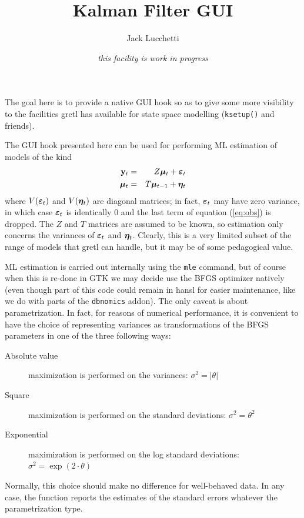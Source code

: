 \documentclass[a4paper]{article}
\title{Kalman Filter GUI}
\author{Jack Lucchetti}
\date{\it this facility is work in progress}
\newcommand{\obs}{\ensuremath\mathbf{y}_t}
\newcommand{\obsdist}{\ensuremath\boldsymbol{\varepsilon}_t}
\newcommand{\state}[1]{\ensuremath\boldsymbol{\mu}_{#1}}
\newcommand{\stdist}{\ensuremath\boldsymbol{\eta}_t}
\begin{document}
\maketitle

The goal here is to provide a native GUI hook so as to give some more
visibility to the facilities gretl has available for state space
modelling (\texttt{ksetup()} and friends).

The GUI hook presented here can be used for performing ML estimation of
models of the kind
\begin{eqnarray}
  \label{eq:obs}
  \obs & = & Z \state{t} + \obsdist \\
  \label{eq:state}
  \state{t} & = & T \state{t-1} + \stdist
\end{eqnarray}
where $V(\obsdist)$ and $V(\stdist)$ are diagonal matrices; in fact,
$\obsdist$ may have zero variance, in which case $\obsdist$ is
identically 0 and the last term of equation (\ref{eq:obs}) is
dropped. The $Z$ and $T$ matrices are assumed to be known, so
estimation only concerns the variances of $\obsdist$ and $\stdist$.
Clearly, this is a very limited subset of the range of models that
gretl can handle, but it may be of some pedagogical value.

ML estimation is carried out internally using the \texttt{mle}
command, but of course when this is re-done in GTK we may decide use
the BFGS optimizer natively (even though part of this code could
remain in hansl for easier maintenance, like we do with parts of the
\texttt{dbnomics} addon). The only caveat is about parametrization. In
fact, for reasons of numerical performance, it is convenient to have
the choice of representing variances as transformations of the BFGS
parameters in one of the three following ways:

\begin{description}
\item[Absolute value] maximization is performed on the variances:
  $\sigma^2 = |\theta|$
\item[Square] maximization is performed on the standard deviations:
  $\sigma^2 = \theta^2$
\item[Exponential] maximization is performed on the log standard deviations:
  $\sigma^2 = \exp(2 \cdot \theta)$
\end{description}

Normally, this choice should make no difference for well-behaved
data. In any case, the function reports the estimates of the standard
errors whatever the parametrization type.
\end{document}
